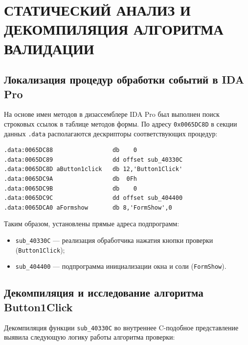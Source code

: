 \documentclass[a4paper]{article}
\begin{document}
\newpage
\section{СТАТИЧЕСКИЙ АНАЛИЗ И ДЕКОМПИЛЯЦИЯ АЛГОРИТМА ВАЛИДАЦИИ}

\subsection{Локализация процедур обработки событий в IDA Pro}
На основе имен методов в дизассемблере IDA Pro был выполнен поиск строковых ссылок в таблице методов формы. По адресу \texttt{0x0065DC8D} в секции данных \texttt{.data} располагаются дескрипторы соответствующих процедур:

\begin{lstlisting}[language={[x86masm]Assembler}]
.data:0065DC88                 db    0
.data:0065DC89                 dd offset sub_40330C
.data:0065DC8D aButton1click   db 12,'Button1Click'
.data:0065DC9A                 db  0Fh
.data:0065DC9B                 db    0
.data:0065DC9C                 dd offset sub_404400
.data:0065DCA0 aFormshow       db 8,'FormShow',0
\end{lstlisting}

Таким образом, установлены прямые адреса подпрограмм:
\begin{itemize}
  \item \texttt{sub\_40330C} --- реализация обработчика нажатия кнопки проверки (\texttt{Button1Click});
  \item \texttt{sub\_404400} --- подпрограмма инициализации окна и соли (\texttt{FormShow}).
\end{itemize}

\subsection{Декомпиляция и исследование алгоритма Button1Click}
Декомпиляция функции \texttt{sub\_40330C} во внутреннее C-подобное представление выявила следующую логику работы алгоритма проверки:
\end{document}
